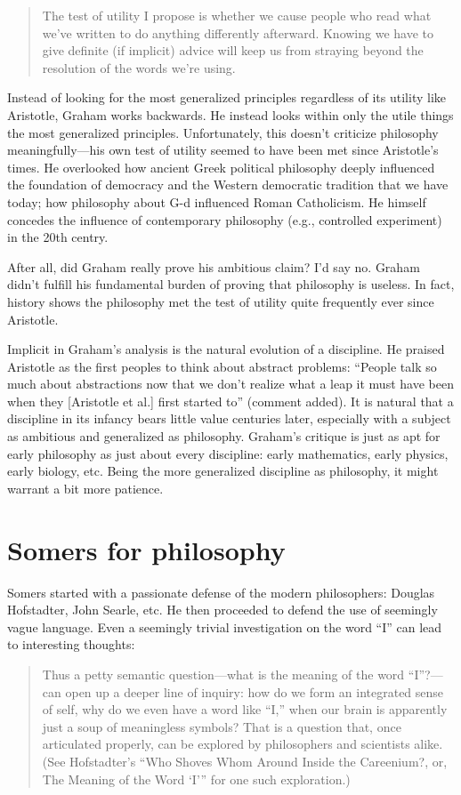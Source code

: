 \documentclass[12pt]{article}
\begin{document}
\begin{quotation}
	The test of utility I propose is whether we cause people who read what we've written to do anything differently afterward. Knowing we have to give definite (if implicit) advice will keep us from straying beyond the resolution of the words we're using.
\end{quotation}

Instead of looking for the most generalized principles regardless of its utility like Aristotle, Graham works backwards. He instead looks within only the utile things the most generalized principles. Unfortunately, this doesn't criticize philosophy meaningfully---his own test of utility seemed to have been met since Aristotle's times. He overlooked how ancient Greek political philosophy deeply influenced the foundation of democracy and the Western democratic tradition that we have today; how philosophy about G-d influenced Roman Catholicism. He himself concedes the influence of contemporary philosophy (e.g., controlled experiment) in the 20th centry.

After all, did Graham really prove his ambitious claim? I'd say no. Graham didn't fulfill his fundamental burden of proving that philosophy is useless. In fact, history shows the philosophy met the test of utility quite frequently ever since Aristotle.

Implicit in Graham's analysis is the natural evolution of a discipline. He praised Aristotle as the first peoples to think about abstract problems: \enquote{People talk so much about abstractions now that we don't realize what a leap it must have been when they [Aristotle et al.] first started to} (comment added). It is natural that a discipline in its infancy bears little value centuries later, especially with a subject as ambitious and generalized as philosophy. Graham's critique is just as apt for early philosophy as just about every discipline: early mathematics, early physics, early biology, etc. Being the more generalized discipline as philosophy, it might warrant a bit more patience.

\section{Somers for philosophy}

Somers started with a passionate defense of the modern philosophers: Douglas Hofstadter, John Searle, etc. He then proceeded to defend the use of seemingly vague language. Even a seemingly trivial investigation on the word \enquote{I} can lead to interesting thoughts:
\begin{quotation}
	Thus a petty semantic question—what is the meaning of the word \enquote{I}?—can open up a deeper line of inquiry: how do we form an integrated sense of self, why do we even have a word like “I,” when our brain is apparently just a soup of meaningless symbols? That is a question that, once articulated properly, can be explored by philosophers and scientists alike. (See Hofstadter’s “Who Shoves Whom Around Inside the Careenium?, or, The Meaning of the Word ‘I’” for one such exploration.)
\end{quotation}
\end{document}
